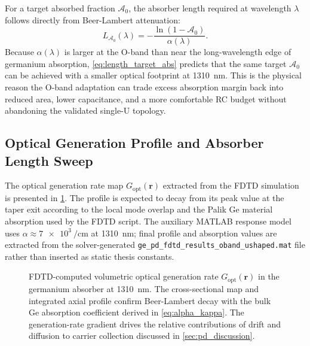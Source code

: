 For a target absorbed fraction $\mathcal{A}_0$, the absorber length required at
wavelength $\lambda$ follows directly from Beer-Lambert attenuation:
\begin{equation}
    L_{\mathcal{A}_0}(\lambda)
    = -\frac{\ln(1-\mathcal{A}_0)}{\alpha(\lambda)}.
    \label{eq:length_target_abs}
\end{equation}
Because $\alpha(\lambda)$ is larger at the O-band than near the long-wavelength
edge of germanium absorption, \cref{eq:length_target_abs} predicts that the same
target $\mathcal{A}_0$ can be achieved with a smaller optical footprint at
\SI{1310}{\nano\metre}. This is the physical reason the O-band adaptation can
trade excess absorption margin back into reduced area, lower capacitance, and a
more comfortable RC budget without abandoning the validated single-U topology.

\subsection[Optical Generation and Length Sweep]{Optical Generation Profile and Absorber Length Sweep}
\label{subsec:pd_optical_results}

The optical generation rate map $G_{\mathrm{opt}}(\mathbf{r})$ extracted from
the FDTD simulation is presented in \cref{fig:gen_rate_map}. The profile is
expected to decay from its peak value at the taper exit according to the local
mode overlap and the Palik Ge material absorption used by the FDTD script. The
auxiliary MATLAB response model uses
$\alpha\approx\SI{7e3}{\per\centi\metre}$ at \SI{1310}{\nano\metre}; final
profile and absorption values are extracted from the solver-generated
\texttt{ge\_pd\_fdtd\_results\_oband\_ushaped.mat} file rather than inserted as
static thesis constants.

\begin{figure}[H]
    \centering
    \caption{FDTD-computed volumetric optical generation rate
    $G_{\mathrm{opt}}(\mathbf{r})$ in the germanium absorber at
    \SI{1310}{\nano\metre}. The cross-sectional map and integrated axial
    profile confirm Beer-Lambert decay with the bulk Ge absorption
    coefficient derived in \cref{eq:alpha_kappa}. The generation-rate
    gradient drives the relative contributions of drift and diffusion to
    carrier collection discussed in \cref{sec:pd_discussion}.}
    \label{fig:gen_rate_map}
\end{figure}

